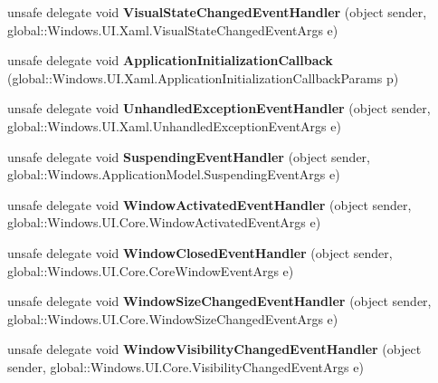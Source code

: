 \begin{DoxyCompactItemize}
unsafe delegate void {\bfseries Visual\+State\+Changed\+Event\+Handler} (object sender, global\+::\+Windows.\+U\+I.\+Xaml.\+Visual\+State\+Changed\+Event\+Args e)
\item 
\mbox{\label{namespace_windows_1_1_u_i_1_1_xaml_ad0b40ceedebe298ba05233452021a58f}} 
unsafe delegate void {\bfseries Application\+Initialization\+Callback} (global\+::\+Windows.\+U\+I.\+Xaml.\+Application\+Initialization\+Callback\+Params p)
\item 
\mbox{\label{namespace_windows_1_1_u_i_1_1_xaml_a84c097356654e27bc15576bdfeca9d81}} 
unsafe delegate void {\bfseries Unhandled\+Exception\+Event\+Handler} (object sender, global\+::\+Windows.\+U\+I.\+Xaml.\+Unhandled\+Exception\+Event\+Args e)
\item 
\mbox{\label{namespace_windows_1_1_u_i_1_1_xaml_a289d222ada0deab9868a8195af2e0516}} 
unsafe delegate void {\bfseries Suspending\+Event\+Handler} (object sender, global\+::\+Windows.\+Application\+Model.\+Suspending\+Event\+Args e)
\item 
\mbox{\label{namespace_windows_1_1_u_i_1_1_xaml_a8f226e361e5bfe1d721d3d837662d25f}} 
unsafe delegate void {\bfseries Window\+Activated\+Event\+Handler} (object sender, global\+::\+Windows.\+U\+I.\+Core.\+Window\+Activated\+Event\+Args e)
\item 
\mbox{\label{namespace_windows_1_1_u_i_1_1_xaml_a90bd60f3761629e9c8f28f5513f3aaa1}} 
unsafe delegate void {\bfseries Window\+Closed\+Event\+Handler} (object sender, global\+::\+Windows.\+U\+I.\+Core.\+Core\+Window\+Event\+Args e)
\item 
\mbox{\label{namespace_windows_1_1_u_i_1_1_xaml_a59724e4b19eb0152ac6129daf3b3a1ae}} 
unsafe delegate void {\bfseries Window\+Size\+Changed\+Event\+Handler} (object sender, global\+::\+Windows.\+U\+I.\+Core.\+Window\+Size\+Changed\+Event\+Args e)
\item 
\mbox{\label{namespace_windows_1_1_u_i_1_1_xaml_ae78cf2539961179479bd9c16705ef7b4}} 
unsafe delegate void {\bfseries Window\+Visibility\+Changed\+Event\+Handler} (object sender, global\+::\+Windows.\+U\+I.\+Core.\+Visibility\+Changed\+Event\+Args e)

\end{DoxyCompactItemize}
